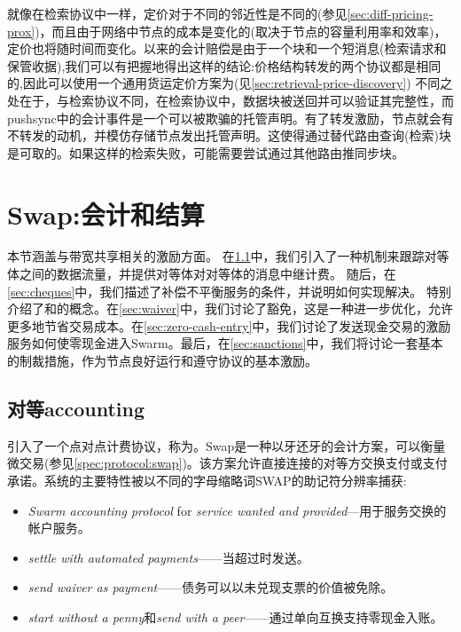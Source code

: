 就像在检索协议中一样，定价对于不同的邻近性是不同的(参见\ref{sec:diff-pricing-prox})，而且由于网络中节点的成本是变化的(取决于节点的容量利用率和效率)，定价也将随时间而变化。以来的会计赔偿是由于一个块和一个短消息(检索请求和保管收据),我们可以有把握地得出这样的结论:价格结构转发的两个协议都是相同的,因此可以使用一个通用货运定价方案为(见\ref{sec:retrieval-price-discovery})
不同之处在于，与检索协议不同，在检索协议中，数据块被送回并可以验证其完整性，而pushsync中的会计事件是一个可以被欺骗的托管声明。有了转发激励，节点就会有不转发的动机，并模仿存储节点发出托管声明。这使得通过替代路由查询(检索)块是可取的。如果这样的检索失败，可能需要尝试通过其他路由推同步块。 
 

\section{Swap:会计和结算}\label{sec:accounting-and-settlement}

\green{}

本节涵盖与带宽共享相关的激励方面。
在\ref{sec:accounting}中，我们引入了一种机制来跟踪对等体之间的数据流量，并提供对等体对对等体的消息中继计费。
随后，在\ref{sec:cheques}中，我们描述了补偿不平衡服务的条件，并说明如何实现解决。
特别介绍了和的概念。在\ref{sec:waiver}中，我们讨论了豁免，这是一种进一步优化，允许更多地节省交易成本。在\ref{sec:zero-cash-entry}中，我们讨论了发送现金交易的激励服务如何使零现金进入Swarm。最后，在\ref{sec:sanctions}中，我们将讨论一套基本的制裁措施，作为节点良好运行和遵守协议的基本激励。

\subsection{对等accounting\statusgreen}\label{sec:accounting}


\cite{ethersphere2016sw3}引入了一个点对点计费协议，称为。Swap是一种以牙还牙的会计方案，可以衡量微交易(参见\ref{spec:protocol:swap})。该方案允许直接连接的对等方交换支付或支付承诺。系统的主要特性被以不同的字母缩略词SWAP的助记符分辨率捕获:

\begin{itemize}
    \item \emph{Swarm accounting protocol} for \emph{service wanted and provided}—用于服务交换的帐户服务。
    \item \emph{settle with automated payments}——当超过时发送。
    \item \emph{send waiver as payment}——债务可以以未兑现支票的价值被免除。 
    \item \emph{start without a penny}和\emph{send with a peer}——通过单向互换支持零现金入账。
\end{itemize}

